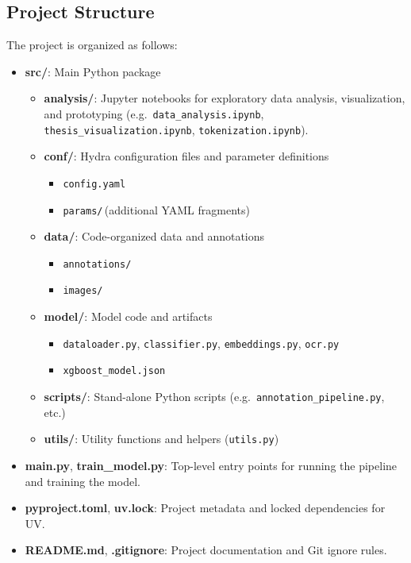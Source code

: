 \documentclass{SGGW-thesis-EN}
\begin{document}
\subsection{Project Structure}
The project is organized as follows:
\begin{itemize}
    \item \textbf{src/}: Main Python package  
    \begin{itemize}
        \item \textbf{analysis/}: Jupyter notebooks for exploratory data analysis, visualization, and prototyping (e.g.\ \texttt{data\_analysis.ipynb}, \texttt{thesis\_visualization.ipynb}, \texttt{tokenization.ipynb}).  
        \item \textbf{conf/}: Hydra configuration files and parameter definitions  
        \begin{itemize}
            \item \texttt{config.yaml}  
            \item \texttt{params/}\,(additional YAML fragments)  
        \end{itemize}
        \item \textbf{data/}: Code-organized data and annotations  
        \begin{itemize}
            \item \texttt{annotations/}  
            \item \texttt{images/}  
        \end{itemize}
        \item \textbf{model/}: Model code and artifacts  
        \begin{itemize}
            \item \texttt{dataloader.py}, \texttt{classifier.py}, \texttt{embeddings.py}, \texttt{ocr.py}  
            \item \texttt{xgboost\_model.json}  
        \end{itemize}
        \item \textbf{scripts/}: Stand-alone Python scripts (e.g.\ \texttt{annotation\_pipeline.py}, etc.)  
        \item \textbf{utils/}: Utility functions and helpers (\texttt{utils.py})  
    \end{itemize}

    \item \textbf{main.py}, \textbf{train\_model.py}: Top-level entry points for running the pipeline and training the model.

    \item \textbf{pyproject.toml}, \textbf{uv.lock}: Project metadata and locked dependencies for UV.

    \item \textbf{README.md}, \textbf{.gitignore}: Project documentation and Git ignore rules.
\end{itemize}
\end{document}
